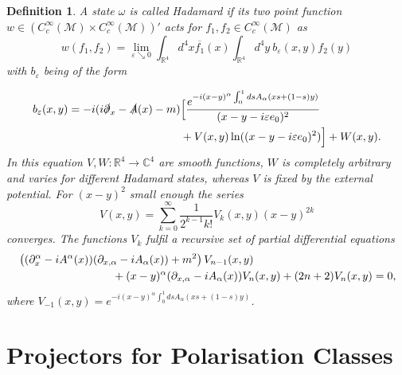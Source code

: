\documentclass[a4paper,11pt]{article}
\newtheorem{de}{Definition}
\begin{document}
\begin{de}
A state \(\omega\) is called Hadamard if its two point function \(w\in (C_c^\infty(\mathcal{M})\times C_c^\infty(\mathcal{M}))'\) 
acts for \(f_1,f_2\in C_c^\infty(\mathcal{M})\) as 
\begin{equation}
w(f_1,f_2)=\lim_{\varepsilon\searrow 0} \int_{\mathbb{R}^4}d^4 x \overline{f_1}(x) \int_{\mathbb{R}^4} d^4y ~b_\varepsilon(x,y) f_2(y)
\end{equation}
with \(b_\varepsilon\) being of the form

\begin{align}\nonumber
b_\varepsilon (x,y)=-i(i\slashed{\partial}_x -\slashed{A}(x)-m)
&\Big[\frac{e^{-i (x-y)^\alpha\int_0^1 ds A_\alpha (x s + (1-s)y)}}{(x-y-i \varepsilon e_0)^2}\\\label{def:hadamard}
&+V(x,y) \ln ((x-y-i \varepsilon e_0)^2)\Big]+W(x,y).
\end{align}
In this equation \(V,W:\mathbb{R}^4\rightarrow \mathbb{C}^4\) are smooth functions, \(W\) is completely arbitrary and varies for
different Hadamard states, whereas \(V\) is fixed by the external potential. For \((x-y)^2\) small enough the series
\begin{equation}
V(x,y)=\sum_{k=0}^\infty \frac{1}{2^{k-1}k!} V_k(x,y) (x-y)^{2k}
\end{equation}
converges.\cite{something...}  The functions \(V_k\) fulfil a recursive set of partial differential equations
\begin{align}\notag
&\left((\partial_{x}^{\alpha}-i A^\alpha(x))(\partial_{x,\alpha}-i A_\alpha(x))+m^2\right) V_{n-1}(x,y)\\\label{Hadamard recursive equ.}
 &\hspace{3cm}+ (x-y)^\alpha (\partial_{x,\alpha}-i A_\alpha(x)) V_{n}(x,y) + (2n+2) V_{n}(x,y)=0,
\end{align}
where \(V_{-1}(x,y)=e^{-i (x-y)^\alpha\int_0^1 ds A_\alpha (x s + (1-s)y)}\).
\end{de}







\section{Projectors for Polarisation Classes}\label{sec:pol classes}
\end{document}
